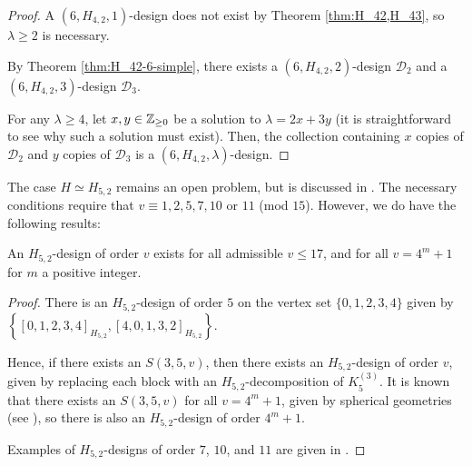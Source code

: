 \begin{proof}
A $(6, H_{4,2}, 1)$-design does not exist by Theorem \ref{thm:H_42,H_43}, so $\lambda \geq 2$ is necessary.

By Theorem \ref{thm:H_42-6-simple}, there exists a $(6, H_{4,2}, 2)$-design $\mathcal{D}_2$ and a $(6, H_{4,2}, 3)$-design $\mathcal{D}_3$.

For any $\lambda \geq 4$, let $x, y \in \mathbb{Z}_{\geq 0}$ be a solution to $\lambda = 2x + 3y$
  (it is straightforward to see why such a solution must exist).
Then, the collection containing $x$ copies of $\mathcal{D}_2$ and $y$ copies of $\mathcal{D}_3$ is a $(6, H_{4,2}, \lambda)$-design.
\end{proof}




The case $H \simeq H_{5,2}$ remains an open problem, but is discussed in \cite{mesz-rosa}.
The necessary conditions require that $v \equiv 1, 2, 5, 7, 10$ or $11$ (mod $15$).
However, we do have the following results:

\begin{theorem} \label{thm:H_52}
An $H_{5,2}$-design of order $v$ exists for all admissible $v \leq 17$, and for
all $v = 4^m + 1$ for $m$ a positive integer.
\end{theorem}

\begin{proof}
There is an $H_{5,2}$-design of order $5$ on the vertex set $\{0,1,2,3,4\}$
  given by $\left\{[0,1,2,3,4]_{H_{5,2}}, [4, 0, 1, 3, 2]_{H_{5,2}} \right\}$.

Hence, if there exists an $S(3, 5, v)$, then there exists an $H_{5,2}$-design of order $v$, given by replacing each block with an $H_{5,2}$-decomposition of $K_5^{(3)}$.
It is known that there exists an $S(3, 5, v)$ for all $v = 4^m+1$, given by spherical geometries (see \cite{khos-laue}), so there is also an $H_{5,2}$-design of order $4^m+1$.

Examples of $H_{5,2}$-designs of order $7$, $10$, and $11$ are given in \cite{mesz-rosa}.
\end{proof}